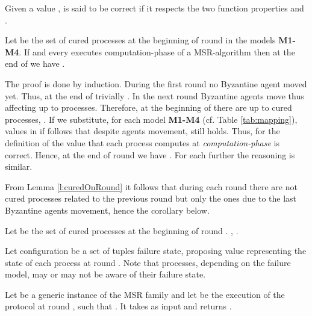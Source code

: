 \begin{definition}
	Given a value ,  is said to be correct if it respects the two   function properties  and .
\end{definition}


\begin{lemma}\label{l:curedOnRound}
	Let  be the set of cured processes at the beginning of round  in the models {\bf M1-M4}. If   and every  executes computation-phase of a MSR-algorithm then at the end of  we have .
\end{lemma}

\begin{proofL}
	The proof is done by induction. 
During the first round  no Byzantine agent moved yet. Thus, at the end of  trivially . 
	In the next round  Byzantine agents move thus affecting up to  processes. Therefore, at the beginning of  there are up to  cured processes, . If we substitute, for each model {\bf M1-M4} (cf. Table \ref{tab:mapping}), values in  if follows that despite agents movement,  still holds. Thus, for the definition of  the value that each process computes at \emph{computation-phase} is correct. Hence, at the end of round  we have .
	For each further  the reasoning is similar.
	\renewcommand{\toto}{l:curedOnRound}
\end{proofL}

From Lemma \ref{l:curedOnRound} it follows that during each round there are not cured processes related to the previous round but only the ones due to the last Byzantine agents movement, hence the corollary below. 

\begin{corollary}\label{c:numberOfCured}
	Let  be the set of cured processes at the beginning of round . , .
\end{corollary}






\begin{definition}[configuration ]
Let configuration  be a set of  tuples failure state, proposing value representing the state of each process  at round . Note that processes, depending on the failure model, may or may not be aware of their failure state.
\end{definition}



\begin{definition}[]
Let   be a generic instance of the MSR family  and let  be the  execution of the protocol  at round , such that . It takes as input  and returns .
\end{definition}

